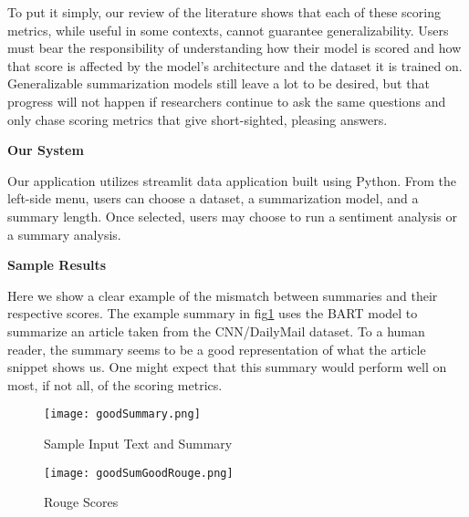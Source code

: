 To put it simply, our review of the literature shows that each of these scoring metrics, while useful in some contexts, cannot guarantee generalizability.
Users must bear the responsibility of understanding how their model is scored and how that score is affected by the model's architecture and the dataset it is trained on.
Generalizable summarization models still leave a lot to be desired, but that progress will not happen if researchers continue to ask the same questions and only chase scoring metrics that give short-sighted, pleasing answers.

\vspace{5pt}

\begin{large}
    \noindent\textbf{Our System}
\end{large}

\vspace{5pt}

Our application utilizes streamlit data application built using Python.
From the left-side menu, users can choose a dataset, a summarization model, and a summary length.
Once selected, users may choose to run a sentiment analysis or a summary analysis.

\vspace{5pt}

\begin{large}
    \noindent\textbf{Sample Results}
\end{large}

\vspace{5pt}

Here we show a clear example of the mismatch between summaries and their respective scores.
The example summary in fig\ref{fig:goodSummary} uses the BART\cite{BART} model to summarize an article taken from the CNN/DailyMail dataset.
To a human reader, the summary seems to be a good representation of what the article snippet shows us.
One might expect that this summary would perform well on most, if not all, of the scoring metrics.

\begin{figure}[ht]
    \centering
    \texttt{[image: goodSummary.png]}
    \caption{Sample Input Text and Summary}
    \label{fig:goodSummary}
\end{figure}

\begin{figure}[ht]
    \centering
    \texttt{[image: goodSumGoodRouge.png]}
    \caption{Rouge Scores}
    \label{fig:goodSumGoodRouge}
\end{figure}

